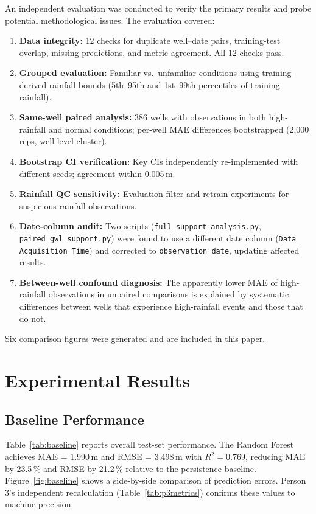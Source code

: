 \documentclass[conference]{IEEEtran}
\begin{document}
An independent evaluation was conducted to verify the primary results and
probe potential methodological issues.
The evaluation covered:
\begin{enumerate}
  \item \textbf{Data integrity:} 12 checks for duplicate well--date pairs,
        training-test overlap, missing predictions, and metric agreement.
        All 12 checks pass.
  \item \textbf{Grouped evaluation:} Familiar vs.\ unfamiliar conditions
        using training-derived rainfall bounds (5th--95th and 1st--99th
        percentiles of training rainfall).
  \item \textbf{Same-well paired analysis:} 386 wells with observations
        in both high-rainfall and normal conditions; per-well MAE
        differences bootstrapped (2{,}000 reps, well-level cluster).
  \item \textbf{Bootstrap CI verification:} Key CIs independently
        re-implemented with different seeds; agreement within 0.005\,m.
  \item \textbf{Rainfall QC sensitivity:} Evaluation-filter and retrain
        experiments for suspicious rainfall observations.
  \item \textbf{Date-column audit:} Two scripts (\texttt{full\_support\_analysis.py},
        \texttt{paired\_gwl\_support.py}) were found to use a different
        date column (\texttt{Data Acquisition Time}) and corrected to
        \texttt{observation\_date}, updating affected results.
  \item \textbf{Between-well confound diagnosis:} The apparently lower MAE
        of high-rainfall observations in unpaired comparisons is explained
        by systematic differences between wells that experience
        high-rainfall events and those that do not.
\end{enumerate}
Six comparison figures were generated and are included in this paper.

\section{Experimental Results}
\label{sec:results}

\subsection{Baseline Performance}

Table~\ref{tab:baseline} reports overall test-set performance.
The Random Forest achieves MAE = 1.990\,m and RMSE = 3.498\,m with
$R^{2} = 0.769$, reducing MAE by 23.5\,\% and RMSE by 21.2\,\% relative
to the persistence baseline.
Figure~\ref{fig:baseline} shows a side-by-side comparison of prediction
errors.
Person 3's independent recalculation (Table~\ref{tab:p3metrics}) confirms
these values to machine precision.
\end{document}

